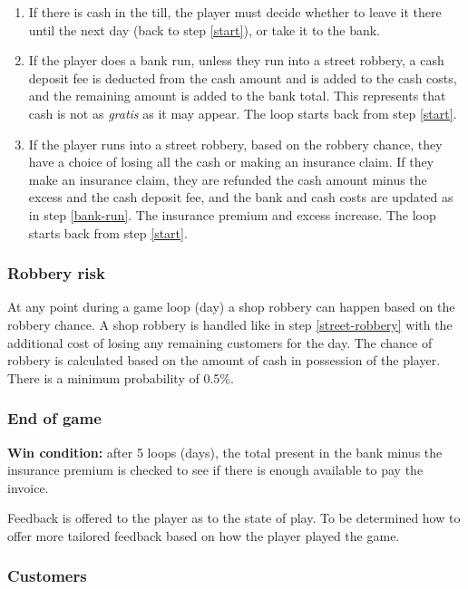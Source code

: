 \documentclass[a4paper,11pt]{article}
\begin{document}
\begin{enumerate}[label={\arabic{enumi}}]
  \begin{enumerate}[label={\arabic{enumi}.\arabic{enumii}}]
  \item If there is cash in the till, the player must decide whether to leave it there until the next day (back to step \ref{start}), or take it to the bank.
  \item \label{bank-run} If the player does a bank run, unless they run into a street robbery, a cash deposit fee is deducted from the cash amount and is added to the cash costs, and the remaining amount is added to the bank total. This represents that cash is not as \emph{gratis} as it may appear. The loop starts back from step \ref{start}.
  \item \label{street-robbery} If the player runs into a street robbery, based on the robbery chance, they have a choice of losing all the cash or making an insurance claim. If they make an insurance claim, they are refunded the cash amount minus the excess and the cash deposit fee, and the bank and cash costs are updated as in step \ref{bank-run}. The insurance premium and excess increase. The loop starts back from step \ref{start}.
  \end{enumerate}
\end{enumerate}

\subsubsection{Robbery risk}
At any point during a game loop (day) a shop robbery can happen based on the robbery chance. A shop robbery is handled like in step \ref{street-robbery} with the additional cost of losing any remaining customers for the day. The chance of robbery is calculated based on the amount of cash in possession of the player. There is a minimum probability of 0.5\%.

\subsubsection{End of game}
\textbf{Win condition:} after 5 loops (days), the total present in the bank minus the insurance premium is checked to see if there is enough available to pay the invoice.

Feedback is offered to the player as to the state of play. To be determined how to offer more tailored feedback based on how the player played the game.

\subsubsection{Customers}\label{customers}
\end{document}

